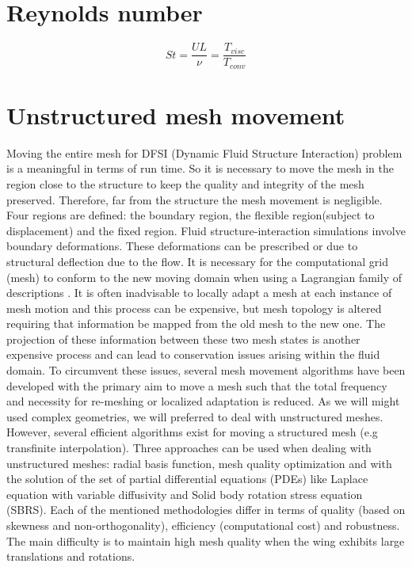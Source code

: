 \documentclass[10pt,a4paper,twoside]{article}
\begin{document}
\section{Reynolds number}
\begin{equation}
St = \frac{UL}{\nu} = \frac{T_{visc}}{T_{conv}}
\end{equation}
\section{Unstructured mesh movement}
Moving the entire mesh for DFSI (Dynamic Fluid Structure Interaction) problem is a meaningful in terms of run time. So it is necessary to move the mesh in the region close to the structure to keep the quality and integrity of the mesh preserved. Therefore, far from the structure the mesh movement is negligible. Four regions are defined: the boundary region, the flexible region(subject to displacement) and the fixed region.
Fluid structure-interaction simulations involve boundary deformations. These deformations can be prescribed or due to structural deflection due to the flow. It is necessary for the computational grid (mesh) to conform to the new moving domain when using a Lagrangian family of descriptions \cite{bogaers2010reduced}. It is often inadvisable to locally adapt a mesh at each instance of mesh motion and this process can be expensive, but mesh topology is altered requiring that information be mapped from the old mesh to the new one. The projection of these information between these two mesh states is another expensive process and can lead to conservation issues arising within the fluid domain. To circumvent these issues, several mesh movement algorithms have been developed with the primary aim to move a mesh such that the total frequency and necessity for re-meshing or localized adaptation is reduced. As we will might used complex geometries, we will preferred to deal with unstructured meshes. However, several efficient algorithms exist for moving a structured mesh (e.g transfinite interpolation). Three approaches can be used when dealing with unstructured meshes: radial basis function, mesh quality optimization and with the solution of the set of partial differential equations (PDEs) like Laplace equation with variable diffusivity and Solid body rotation stress equation (SBRS). Each of the mentioned methodologies differ in terms of quality (based on skewness and non-orthogonality), efficiency (computational cost) and robustness. The main difficulty is to maintain high mesh quality when the wing exhibits large translations and rotations.
\end{document}
